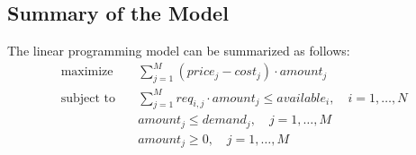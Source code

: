 \documentclass{article}
\begin{document}
\subsection*{Summary of the Model}
The linear programming model can be summarized as follows:
\[
\begin{align*}
\text{maximize} & \quad \sum_{j=1}^{M} (price_j - cost_j) \cdot amount_j \\
\text{subject to} & \quad \sum_{j=1}^{M} req_{i,j} \cdot amount_j \leq available_i, \quad i = 1, \ldots, N \\
& \quad amount_j \leq demand_j, \quad j = 1, \ldots, M \\
& \quad amount_j \geq 0, \quad j = 1, \ldots, M
\end{align*}
\]
\end{document}
